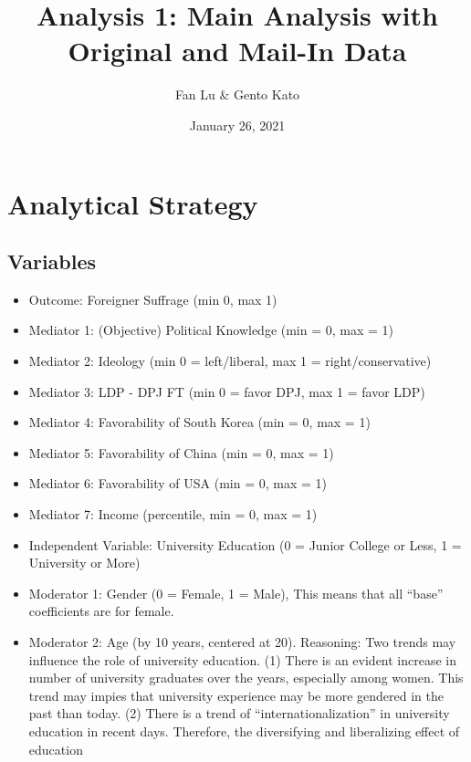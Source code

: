 \documentclass[
]{article}
\title{Analysis 1: Main Analysis with Original and Mail-In Data}
\author{Fan Lu \& Gento Kato}
\date{January 26, 2021}
\begin{document}
\maketitle

\hypertarget{analytical-strategy}{%
\section{Analytical Strategy}\label{analytical-strategy}}

\hypertarget{variables}{%
\subsection{Variables}\label{variables}}

\begin{itemize}
\item
  Outcome: Foreigner Suffrage (min 0, max 1)
\item
  Mediator 1: (Objective) Political Knowledge (min = 0, max = 1)
\item
  Mediator 2: Ideology (min 0 = left/liberal, max 1 =
  right/conservative)
\item
  Mediator 3: LDP - DPJ FT (min 0 = favor DPJ, max 1 = favor LDP)
\item
  Mediator 4: Favorability of South Korea (min = 0, max = 1)\\
\item
  Mediator 5: Favorability of China (min = 0, max = 1)\\
\item
  Mediator 6: Favorability of USA (min = 0, max = 1)\\
\item
  Mediator 7: Income (percentile, min = 0, max = 1)
\item
  Independent Variable: University Education (0 = Junior College or
  Less, 1 = University or More)
\item
  Moderator 1: Gender (0 = Female, 1 = Male), This means that all
  ``base'' coefficients are for female.
\item
  Moderator 2: Age (by 10 years, centered at 20). Reasoning: Two trends
  may influence the role of university education. (1) There is an
  evident increase in number of university graduates over the years,
  especially among women. This trend may impies that university
  experience may be more gendered in the past than today. (2) There is a
  trend of ``internationalization'' in university education in recent
  days. Therefore, the diversifying and liberalizing effect of education

\end{itemize}
\end{document}
